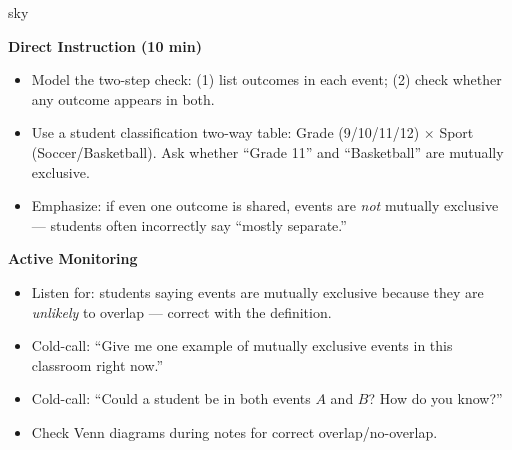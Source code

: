 \documentclass[10pt]{article}
\begin{document}
\begin{skillbox}{sky}
\begin{minipage}[t]{0.48\linewidth}
    \textbf{Direct Instruction (10 min)}
    \begin{itemize}
        \item Model the two-step check: (1) list outcomes in each event;
              (2) check whether any outcome appears in both.
        \item Use a student classification two-way table:
              Grade (9/10/11/12) $\times$ Sport (Soccer/Basketball). Ask whether
              ``Grade 11'' and ``Basketball'' are mutually exclusive.
        \item Emphasize: if even one outcome is shared, events are \emph{not}
              mutually exclusive --- students often incorrectly say ``mostly separate.''
    \end{itemize}
\end{minipage}
\hfill
\begin{minipage}[t]{0.48\linewidth}
    \textbf{Active Monitoring}
    \begin{itemize}
        \item Listen for: students saying events are mutually exclusive because they
              are \emph{unlikely} to overlap --- correct with the definition.
        \item Cold-call: ``Give me one example of mutually exclusive events in this
              classroom right now.''
        \item Cold-call: ``Could a student be in both events $A$ and $B$?
              How do you know?''
        \item Check Venn diagrams during notes for correct overlap/no-overlap.
    \end{itemize}
\end{minipage}
\end{skillbox}
\end{document}
